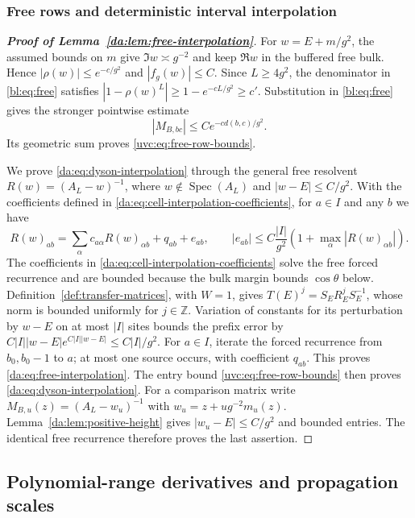 \documentclass[11pt]{article}
\numberwithin{equation}{section}
\theoremstyle{remark}
\newcommand{\Z}{\mathbb Z}
\begin{document}
\subsubsection{Free rows and deterministic interval interpolation}\label{app:free-interpolation}
\begin{proof}[\textbf{Proof of Lemma~\ref{da:lem:free-interpolation}}]
For $w=E+m/g^2$, the assumed bounds on $m$ give
$\Im w\asymp g^{-2}$ and keep $\Re w$ in the buffered free bulk.
Hence $|\rho(w)|\le e^{-c/g^2}$ and $|f_g(w)|\le C$.
Since $L\ge4g^2$, the denominator in \eqref{bl:eq:free} satisfies
$|1-\rho(w)^L|\ge1-e^{-cL/g^2}\ge c'$. Substitution in
\eqref{bl:eq:free} gives the stronger pointwise estimate
\begin{equation}\label{da:eq:free-row-decay}
 |M_{B,bc}|\le Ce^{-cd(b,c)/g^2}.
\end{equation}
Its geometric sum proves \eqref{uvc:eq:free-row-bounds}.

We prove \eqref{da:eq:dyson-interpolation} through the general free
resolvent $R(w)=(A_L-w)^{-1}$, where $w\notin\operatorname{Spec}(A_L)$
and $|w-E|\le C/g^2$. With the coefficients defined in
\eqref{da:eq:cell-interpolation-coefficients}, for $a\in I$ and any $b$ we have
\begin{equation}\label{da:eq:free-interpolation}
 R(w)_{ab}=\sum_\alpha c_{a\alpha}R(w)_{\alpha b}+q_{ab}+e_{ab},\qquad
 |e_{ab}|\le C\frac{|I|}{g^2}(1+\max_\alpha|R(w)_{\alpha b}|).
\end{equation}
The coefficients in \eqref{da:eq:cell-interpolation-coefficients} solve
the free forced recurrence and are bounded because the bulk margin
bounds $\cos\theta$ below.
Definition~\ref{def:transfer-matrices}, with $W=1$, gives
$T(E)^j=S_ER_E^jS_E^{-1}$, whose norm is bounded uniformly for $j\in\Z$.
Variation of constants for its perturbation by $w-E$
on at most $|I|$ sites bounds the prefix error by
$C|I||w-E|e^{C|I||w-E|}\le C|I|/g^2$.
For $a\in I$, iterate the forced recurrence from $b_0,b_0-1$ to $a$;
at most one source occurs, with coefficient $q_{ab}$. This proves
\eqref{da:eq:free-interpolation}.
The entry bound \eqref{uvc:eq:free-row-bounds} then proves
\eqref{da:eq:dyson-interpolation}.
For a comparison matrix write
$M_{B,u}(z)=(A_L-w_u)^{-1}$ with $w_u=z+ug^{-2}m_u(z)$.
Lemma~\ref{da:lem:positive-height} gives $|w_u-E|\le C/g^2$ and bounded
entries. The identical free recurrence therefore proves the last assertion.
\end{proof}

\subsection{Polynomial-range derivatives and propagation scales}
\label{app:large-flow}
\end{document}
